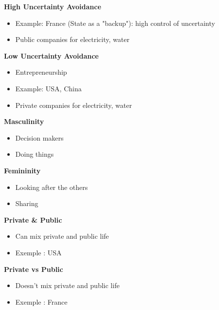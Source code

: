 \documentclass[11pt,a4paper,oneside,french,svgnames]{report}
\begin{document}
\begin{center}
\begin{minipage}[t]{.45\textwidth}
\centering\textbf{High Uncertainty Avoidance}\\
  \begin{itemize}
    \item Example: France (State as a "backup"): high control of uncertainty
    \item Public companies for electricity, water
  \end{itemize}
\end{minipage}
\begin{minipage}[t]{.45\textwidth}
\centering\textbf{Low Uncertainty Avoidance}\\
  \begin{itemize}
    \item Entrepreneurship
    \item Example: USA, China
    \item Private companies for electricity, water
  \end{itemize}
\end{minipage}

\begin{minipage}[t]{.45\textwidth}
\centering\textbf{Masculinity}\\
  \begin{itemize}
    \item Decision makers
    \item Doing things
  \end{itemize}
\end{minipage}
\begin{minipage}[t]{.45\textwidth}
\centering\textbf{Femininity}\\
  \begin{itemize}
    \item Looking after the others
    \item Sharing
  \end{itemize}
\end{minipage}

\begin{minipage}[t]{.45\textwidth}
\centering\textbf{Private & Public}\\
  \begin{itemize}
    \item Can mix private and public life
    \item Exemple : USA
  \end{itemize}
\end{minipage}
\begin{minipage}[t]{.45\textwidth}
\centering\textbf{Private vs Public}\\
  \begin{itemize}
    \item Doesn't mix private and public life
    \item Exemple : France
  \end{itemize}
\end{minipage}

\end{center}
\end{document}
